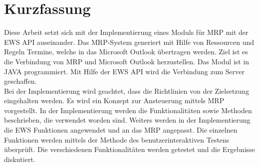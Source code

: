 \chapter{Kurzfassung}
Diese Arbeit setzt sich mit der Implementierung eines Moduls für MRP mit der EWS API auseinander. Das MRP-System generiert mit Hilfe von Ressourcen und Regeln Termine, welche in das Microsoft Outlook übertragen werden. Ziel ist es die Verbindung von MRP und Microsoft Outlook herzustellen. Das Modul ist in JAVA programmiert. Mit Hilfe der EWS API wird die Verbindung zum Server geschaffen.\\ Bei der Implementierung wird geachtet, dass die Richtlinien von der Zielsetzung eingehalten werden. Es wird ein Konzept zur Ansteuerung mittels MRP vorgestellt. In der Implementierung werden die Funktionalitäten sowie Methoden beschrieben, die verwendet worden sind. Weiters werden in der Implementierung die EWS Funktionen angewendet und an das MRP angepasst. Die einzelnen Funktionen werden mittels der Methode des benutzerinteraktiven Testens überprüft. Die verschiedenen Funktionalitäten werden getestet und die Ergebnisse diskutiert.
